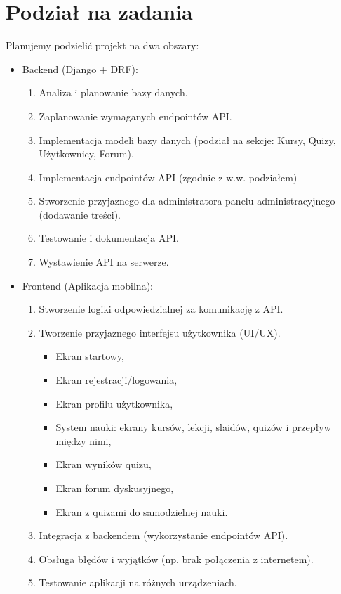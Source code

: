 \documentclass[11pt,a4paper]{article}
\numberwithin{equation}{section}
\begin{document}
\section{Podział na zadania}
Planujemy podzielić projekt na dwa obszary:
\begin{itemize}
    \item Backend (Django + DRF):
        \begin{enumerate}
            \item Analiza i planowanie bazy danych.
            \item Zaplanowanie wymaganych endpointów API.
            \item Implementacja modeli bazy danych (podział na sekcje: Kursy, Quizy, Użytkownicy, Forum).
            \item Implementacja endpointów API (zgodnie z w.w. podziałem)
            \item Stworzenie przyjaznego dla administratora panelu administracyjnego (dodawanie treści).
            \item Testowanie i dokumentacja API.
            \item Wystawienie API na serwerze.
        \end{enumerate}
    \item Frontend (Aplikacja mobilna):
        \begin{enumerate}
            \item Stworzenie logiki odpowiedzialnej za komunikację z API.
            \item Tworzenie przyjaznego interfejsu użytkownika (UI/UX).
                \begin{itemize}
                    \item Ekran startowy,
                    \item Ekran rejestracji/logowania,
                    \item Ekran profilu użytkownika,
                    \item System nauki: ekrany kursów, lekcji, slaidów, quizów i przepływ między nimi,
                    \item Ekran wyników quizu,
                    \item Ekran forum dyskusyjnego,
                    \item Ekran z quizami do samodzielnej nauki.
                \end{itemize}
            \item Integracja z backendem (wykorzystanie endpointów API).
            \item Obsługa błędów i wyjątków (np. brak połączenia z internetem).
            \item Testowanie aplikacji na różnych urządzeniach.
        \end{enumerate}
\end{itemize}
\end{document}
